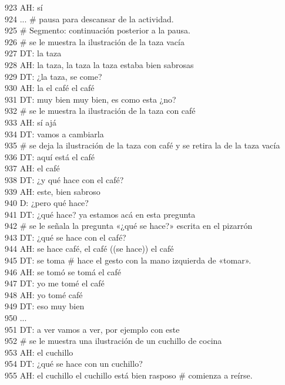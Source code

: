 923 AH: sí\\
924 ... # pausa para descansar de la actividad.\\
925 # Segmento: continuación posterior a la pausa.\\
926 # se le muestra la ilustración de la taza vacía\\
927 DT: la taza\\
928 AH: la taza, la taza la taza estaba bien sabrosas\\
929 DT: ¿la taza, se come?\\
930 AH: la el café el café\\
931 DT: muy bien muy bien, es como esta ¿no?\\
932 # se le muestra la ilustración de la taza con café\\
933 AH: sí ajá\\
934 DT: vamos a cambiarla\\
935 # se deja la ilustración de la taza con café y se retira la de la taza vacía\\
936 DT: aquí está el café\\
937 AH: el café\\
938 DT: ¿y qué hace con el café?\\
939 AH: este, bien sabroso\\
940 D: ¿pero qué hace?\\
941 DT: ¿qué hace? ya estamos acá en esta pregunta\\
942 # se le señala la pregunta «¿qué se hace?» escrita en el pizarrón\\
943 DT: ¿qué se hace con el café?\\
944 AH: se hace café, el café ((se hace)) el café\\
945 DT: se toma # hace el gesto con la mano izquierda de «tomar».\\
946 AH: se tomó se tomá el café\\
947 DT: yo me tomé el café\\
948 AH: yo tomé café\\
949 DT: eso muy bien\\
950 ...\\
951 DT: a ver vamos a ver, por ejemplo con este\\
952 # se le muestra una ilustración de un cuchillo de cocina\\
953 AH: el cuchillo\\
954 DT: ¿qué se hace con un cuchillo?\\
955 AH: el cuchillo el cuchillo está bien rasposo # comienza a reírse.\\
